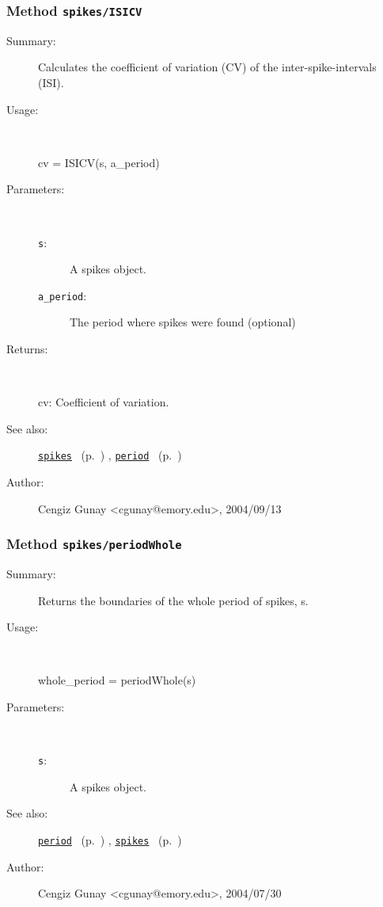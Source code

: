 \subsubsection[Method \texttt{ISICV}]{Method \texttt{spikes/ISICV}}%
%
\label{ref_spikes__ISICV}%
\hypertarget{ref_spikes__ISICV}{}%
\begin{description}
\item[Summary:]Calculates the coefficient of variation (CV) of the 
	inter-spike-intervals (ISI).
%
\item[Usage:]~%
\begin{lyxcode}%
cv = ISICV(s, a\_period)
%
\end{lyxcode}%
%
%
\item[Parameters:]~
\begin{description}%
\item[\texttt{s}:]
 A spikes object.
\item[\texttt{a\_period}:]
 The period where spikes were found (optional)
\end{description}%
%
\item[Returns:
]~

	cv: Coefficient of variation.
%
%
\item[See also:]%
\hyperlink{ref_spikes}{\texttt{spikes}}%
\ (p.~\pageref{ref_spikes})%
%
, \hyperlink{ref_period}{\texttt{period}}%
\ (p.~\pageref{ref_period})%
%
%
\item[Author:]%
Cengiz Gunay <cgunay@emory.edu>, 2004/09/13
%
\end{description}
\methodline%
\subsubsection[Method \texttt{periodWhole}]{Method \texttt{spikes/periodWhole}}%
%
\label{ref_spikes__periodWhole}%
\hypertarget{ref_spikes__periodWhole}{}%
\begin{description}
\item[Summary:]Returns the boundaries of the whole period of spikes, s. 
%
\item[Usage:]~%
\begin{lyxcode}%
whole\_period = periodWhole(s)
%
\end{lyxcode}%
%
%
\item[Parameters:]~
\begin{description}%
\item[\texttt{s}:]
 A spikes object.
\end{description}%
%
%
%
\item[See also:]%
\hyperlink{ref_period}{\texttt{period}}%
\ (p.~\pageref{ref_period})%
%
, \hyperlink{ref_spikes}{\texttt{spikes}}%
\ (p.~\pageref{ref_spikes})%
%
%
\item[Author:]%
Cengiz Gunay <cgunay@emory.edu>, 2004/07/30
%
\end{description}
\methodline%
